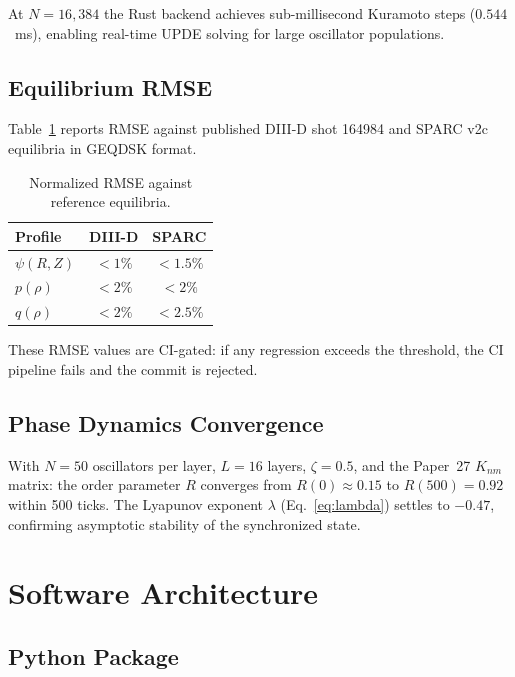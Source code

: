 \documentclass[twocolumn,preprintnumbers,amsmath,amssymb,prl,floatfix]{revtex4-2}
\begin{document}
At $N = 16{,}384$ the Rust backend achieves sub-millisecond
Kuramoto steps ($0.544$~ms), enabling real-time UPDE solving
for large oscillator populations.

\subsection{Equilibrium RMSE}

Table~\ref{tab:rmse} reports RMSE against published DIII-D
shot 164984 and SPARC v2c equilibria in GEQDSK format.

\begin{table}[tb]
\centering
\caption{Normalized RMSE against reference equilibria.}
\label{tab:rmse}
\begin{tabular}{lcc}
\toprule
Profile & DIII-D & SPARC \\
\midrule
$\psi(R,Z)$ & $< 1\%$ & $< 1.5\%$ \\
$p(\rho)$   & $< 2\%$ & $< 2\%$   \\
$q(\rho)$   & $< 2\%$ & $< 2.5\%$ \\
\bottomrule
\end{tabular}
\end{table}

These RMSE values are CI-gated: if any regression exceeds the
threshold, the CI pipeline fails and the commit is rejected.

\subsection{Phase Dynamics Convergence}

With $N = 50$ oscillators per layer, $L = 16$ layers,
$\zeta = 0.5$, and the Paper~27 $K_{nm}$ matrix:
the order parameter $R$ converges from $R(0) \approx 0.15$ to
$R(500) = 0.92$ within 500 ticks.  The Lyapunov exponent
$\lambda$ (Eq.~\ref{eq:lambda}) settles to $-0.47$, confirming
asymptotic stability of the synchronized state.


\section{Software Architecture}
\label{sec:software}

\subsection{Python Package}
\end{document}
